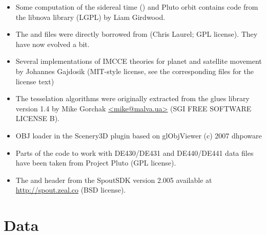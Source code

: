 \begin{itemize}		
  \item Some computation of the sidereal time () and Pluto
      orbit contains code from the libnova library (LGPL) by Liam Girdwood.
  \item The  and  files were directly borrowed from
       (Chris Laurel; GPL license). They have now evolved a bit.
  \item Several implementations of IMCCE theories for planet and satellite movement by Johannes Gajdosik 
       (MIT-style license, see the corresponding files for the license text)
  \item The tesselation algorithms were originally extracted from the glues 
      library version 1.4 by Mike Gorchak \url{<mike@malva.ua>} (SGI FREE SOFTWARE LICENSE B).
  \item OBJ loader in the Scenery3D plugin based on glObjViewer (c) 2007 dhpoware
  \item Parts of the code to work with DE430/DE431 and DE440/DE441 data files have been taken from Project Pluto (GPL license).
  \item The  and header from the SpoutSDK version 2.005 available at \url{http://spout.zeal.co} (BSD license).
\end{itemize}

\section{Data}
\label{sec:ack:data}

